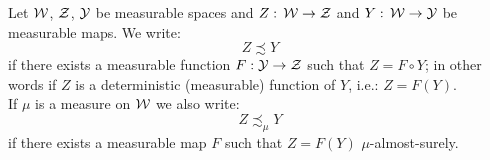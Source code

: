 \begin{Not}
 Let $\mathcal{W}$, $\mathcal{Z}$, $\mathcal{Y}$ be measurable spaces and $Z:\, \mathcal{W} \to \mathcal{Z}$ and $Y:\,\mathcal{W} \to \mathcal{Y}$ be measurable maps.
 We write:
 \[ Z \precsim Y  \]%
 if there exists a measurable function $F: \mathcal{Y} \to \mathcal{Z}$ %
 such that $Z= F \circ Y $; in other words if $Z$ is a deterministic (measurable) function of $Y$, i.e.: $Z=F(Y)$.\\
 If $\mu$ is a measure on $\mathcal{W}$ we also write:
 \[ Z \precsim_\mu Y\]
 if there exists a measurable map $F$ such that $Z=F(Y)$ $\mu$-almost-surely.

\end{Not}

